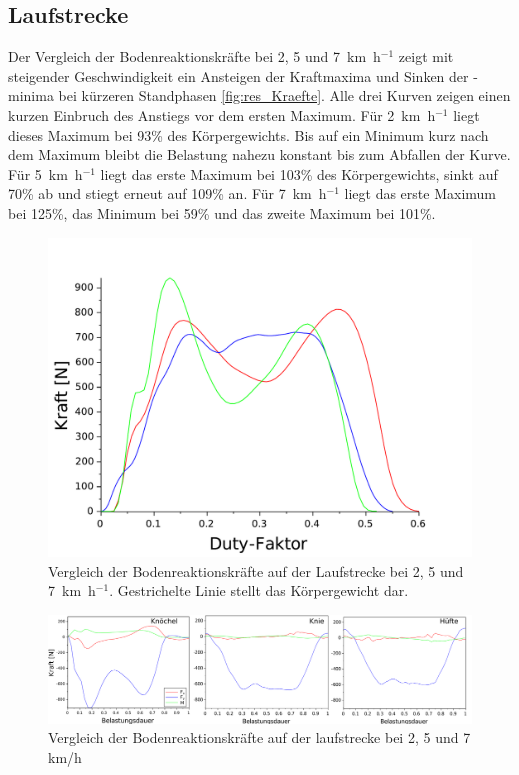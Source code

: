 \subsection{Laufstrecke}
Der Vergleich der Bodenreaktionskräfte bei 2, 5 und 7~km~h$^{-1}$ zeigt mit steigender Geschwindigkeit ein Ansteigen der Kraftmaxima und Sinken der -minima bei kürzeren Standphasen \autoref{fig:res_Kraefte}. Alle drei Kurven zeigen einen kurzen Einbruch des Anstiegs vor dem ersten Maximum. Für 2~km~h$^{-1}$ liegt dieses Maximum bei 93\% des Körpergewichts. Bis auf ein Minimum kurz nach dem Maximum bleibt die Belastung nahezu konstant bis zum Abfallen der Kurve. Für 5~km~h$^{-1}$ liegt das erste Maximum bei 103\% des Körpergewichts, sinkt auf 70\% ab und stiegt erneut auf 109\% an. Für 7~km~h$^{-1}$ liegt das erste Maximum bei 125\%, das Minimum bei 59\% und das zweite Maximum bei 101\%.
\begin{figure}[h!]
	\centering
	\includegraphics[width=0.7\linewidth]{bilder/Ergebnisse/BRK}
	\caption[Bodenreaktionskräfte]{Vergleich der Bodenreaktionskräfte auf der Laufstrecke bei 2, 5 und 7~km~h$^{-1}$. Gestrichelte Linie stellt das Körpergewicht dar.}
	\label{fig:res_Kraefte}
\end{figure}

\begin{figure}[h!]
	\centering
	\includegraphics[width=\linewidth]{bilder/Ergebnisse/langs_inv_kin}
	\caption[Bodenreaktionskräfte]{Vergleich der Bodenreaktionskräfte auf der laufstrecke bei 2, 5 und 7 km/h}
	\label{fig:langs_inv_kin}
\end{figure}


